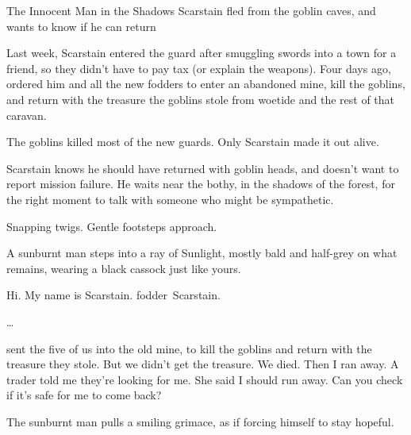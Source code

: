 \begin{multicols}{2}
{The Innocent Man in the Shadows}%
{ Scarstain fled from the goblin caves, and wants to know if he can return}%

\begin{exampletext}
  Last week, Scarstain entered the \gls{guard} after smuggling swords into a town for a friend, so they didn't have to pay tax (or explain the \glspl{weapon}).
  Four days ago,  ordered him and all the new \glspl{fodder} to enter an abandoned mine, kill the goblins, and return with the treasure the goblins stole from \gls{woetide} and the rest of that caravan.

  The goblins killed most of the new \glspl{guard}.
  Only Scarstain made it out alive.
\end{exampletext}

Scarstain knows he should have returned with goblin heads, and doesn't want to report mission failure.
He waits near the \gls{bothy}, in the shadows of the forest, for the right moment to talk with someone who might be sympathetic.

\begin{boxtext}
  Snapping twigs.
  Gentle footsteps approach.
\end{boxtext}


\begin{boxtext}
  A sunburnt man steps into a ray of Sunlight, mostly bald and half-grey on what remains, wearing a black cassock just like yours.

  \begin{speechtext}
    Hi.
    My name is Scarstain.
    \Gls{fodder}~Scarstain.

    \ldots

     sent the five of us into the old mine, to kill the goblins and return with the treasure they stole.
    But we didn't get the treasure.
    We died.
    Then I ran away.
    A trader told me they're looking for me.
    She said I should run away.
    Can you check if it's safe for me to come back?
  \end{speechtext}

  The sunburnt man pulls a smiling grimace, as if forcing himself to stay hopeful.
\end{boxtext}


\end{multicols}
